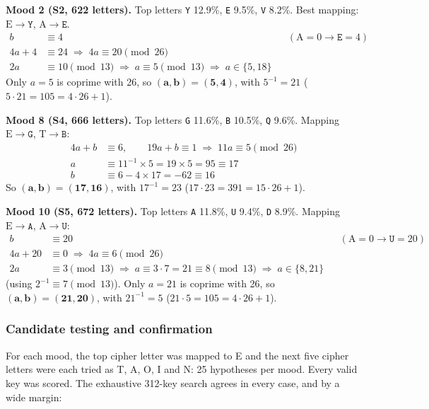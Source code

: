 \documentclass[11pt,a4paper]{article}
\DeclareRobustCommand{\_}{\textunderscore\allowbreak}  %
\newcommand{\ct}[1]{\texttt{#1}}
\begin{document}
\textbf{Mood 2 (S2, 622 letters).} Top letters \ct{Y} 12.9\%, \ct{E} 9.5\%, \ct{V} 8.2\%. Best mapping:
$\mathrm{E}\rightarrow\ct{Y}$, $\mathrm{A}\rightarrow\ct{E}$.
\begin{align*}
b &\equiv 4 && (\mathrm{A}=0 \rightarrow \ct{E}=4)\\
4a + 4 &\equiv 24 \;\Rightarrow\; 4a \equiv 20 \pmod{26}\\
2a &\equiv 10 \pmod{13} \;\Rightarrow\; a \equiv 5 \pmod{13} \;\Rightarrow\; a \in \{5, 18\}
\end{align*}
Only $a=5$ is coprime with 26, so $\mathbf{(a,b)=(5,4)}$, with $5^{-1} = 21$ ($5\cdot21 = 105 = 4\cdot26+1$).

\textbf{Mood 8 (S4, 666 letters).} Top letters \ct{G} 11.6\%, \ct{B} 10.5\%, \ct{Q} 9.6\%. Mapping
$\mathrm{E}\rightarrow\ct{G}$, $\mathrm{T}\rightarrow\ct{B}$:
\begin{align*}
4a + b &\equiv 6, \qquad 19a + b \equiv 1 \;\Rightarrow\; 11a \equiv 5 \pmod{26}\\
a &\equiv 11^{-1}\times 5 = 19 \times 5 = 95 \equiv 17\\
b &\equiv 6 - 4\times17 = -62 \equiv 16
\end{align*}
So $\mathbf{(a,b)=(17,16)}$, with $17^{-1} = 23$ ($17\cdot 23 = 391 = 15\cdot26+1$).

\textbf{Mood 10 (S5, 672 letters).} Top letters \ct{A} 11.8\%, \ct{U} 9.4\%, \ct{D} 8.9\%. Mapping
$\mathrm{E}\rightarrow\ct{A}$, $\mathrm{A}\rightarrow\ct{U}$:
\begin{align*}
b &\equiv 20 && (\mathrm{A}=0 \rightarrow \ct{U}=20)\\
4a + 20 &\equiv 0 \;\Rightarrow\; 4a \equiv 6 \pmod{26}\\
2a &\equiv 3 \pmod{13} \;\Rightarrow\; a \equiv 3\cdot 7 = 21 \equiv 8 \pmod{13} \;\Rightarrow\; a \in \{8, 21\}
\end{align*}
(using $2^{-1} \equiv 7 \pmod{13}$). Only $a=21$ is coprime with 26, so $\mathbf{(a,b)=(21,20)}$, with $21^{-1} = 5$
($21\cdot 5 = 105 = 4\cdot26+1$).

\subsubsection*{Candidate testing and confirmation}
For each mood, the top cipher letter was mapped to E and the next five cipher letters were each tried as T, A, O, I
and N: 25 hypotheses per mood. Every valid key was scored. The
exhaustive 312-key search agrees in every case, and by a wide margin:
\end{document}
